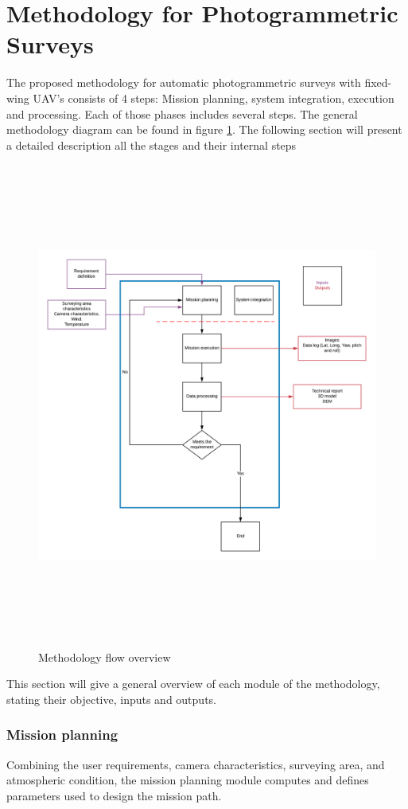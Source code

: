 \section{Methodology for Photogrammetric Surveys}
The proposed methodology for automatic photogrammetric surveys with fixed-wing UAV's consists of 4 steps: Mission planning, system integration, execution and processing. Each of those phases includes several steps. The general methodology diagram can be found in figure \ref{fig:methodology_Flow}.
The following section will present a detailed description all the stages and their internal steps
\begin{figure}[H]
\centering
\includegraphics[width=16cm,height=16cm,keepaspectratio]{imagenes/Methodology.png}
\caption{Methodology flow overview}
\label{fig:methodology_Flow}
\end{figure}

This section will give a general overview of each module of the methodology, stating their objective, inputs and outputs.

\subsubsection{Mission planning}
Combining the user requirements, camera characteristics, surveying area, and atmospheric condition, the mission planning module computes and defines parameters used to design the mission path.


